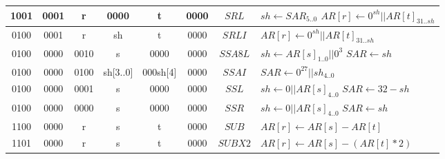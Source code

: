 \begin{longtable}{llllllllllllllllllllllll  p{1cm}  p{6cm} | }
        \multicolumn{4}{|c|}{1001} & \multicolumn{4}{c|}{0001} & \multicolumn{4}{c|}{r} & \multicolumn{4}{c|}{0000} & \multicolumn{4}{c|}{t} & \multicolumn{4}{c|}{0000} & \multicolumn{1}{c|}{$SRL$} & $sh \leftarrow SAR_{5..0}$ \newline $AR[r] \leftarrow 0^{sh} || AR[t]_{31..sh}$ \\ \hline        
        \multicolumn{4}{|c|}{0100} & \multicolumn{4}{c|}{0001} & \multicolumn{4}{c|}{r} & \multicolumn{4}{c|}{sh} & \multicolumn{4}{c|}{t} & \multicolumn{4}{c|}{0000} & \multicolumn{1}{c|}{$SRLI$} & $AR[r] \leftarrow 0^{sh} || AR[t]_{31..sh}$ \\ \hline
        \multicolumn{4}{|c|}{0100} & \multicolumn{4}{c|}{0000} & \multicolumn{4}{c|}{0010} & \multicolumn{4}{c|}{s} & \multicolumn{4}{c|}{0000} & \multicolumn{4}{c|}{0000} & \multicolumn{1}{c|}{$SSA8L$} & $sh \leftarrow AR[s]_{1..0} || 0^3$ \newline $SAR \leftarrow sh$ \\ \hline
        \multicolumn{4}{|c|}{0100} & \multicolumn{4}{c|}{0000} & \multicolumn{4}{c|}{0100} & \multicolumn{4}{c|}{sh[3..0]} & \multicolumn{4}{c|}{000sh[4]} & \multicolumn{4}{c|}{0000} & \multicolumn{1}{c|}{$SSAI$} & $SAR \leftarrow 0^{27} || sh_{4..0}$ \\ \hline
        \multicolumn{4}{|c|}{0100} & \multicolumn{4}{c|}{0000} & \multicolumn{4}{c|}{0001} & \multicolumn{4}{c|}{s} & \multicolumn{4}{c|}{0000} & \multicolumn{4}{c|}{0000} & \multicolumn{1}{c|}{$SSL$} & $sh \leftarrow 0 || AR[s]_{4..0}$ \newline $SAR \leftarrow 32 - sh$ \\ \hline
        \multicolumn{4}{|c|}{0100} & \multicolumn{4}{c|}{0000} & \multicolumn{4}{c|}{0000} & \multicolumn{4}{c|}{s} & \multicolumn{4}{c|}{0000} & \multicolumn{4}{c|}{0000} & \multicolumn{1}{c|}{$SSR$} & $sh \leftarrow 0 || AR[s]_{4..0}$ \newline $SAR \leftarrow sh$ \\ \hline
		\multicolumn{4}{|c|}{1100} & \multicolumn{4}{c|}{0000} & \multicolumn{4}{c|}{r} & \multicolumn{4}{c|}{s} & \multicolumn{4}{c|}{t} & \multicolumn{4}{c|}{0000} & \multicolumn{1}{c|}{$SUB$} & $AR[r] \leftarrow AR[s] - AR[t]$ \\ \hline        
		\multicolumn{4}{|c|}{1101} & \multicolumn{4}{c|}{0000} & \multicolumn{4}{c|}{r} & \multicolumn{4}{c|}{s} & \multicolumn{4}{c|}{t} & \multicolumn{4}{c|}{0000} & \multicolumn{1}{c|}{$SUBX2$} & $AR[r] \leftarrow AR[s] - (AR[t]*2)$ \\ \hline        

\end{longtable}
